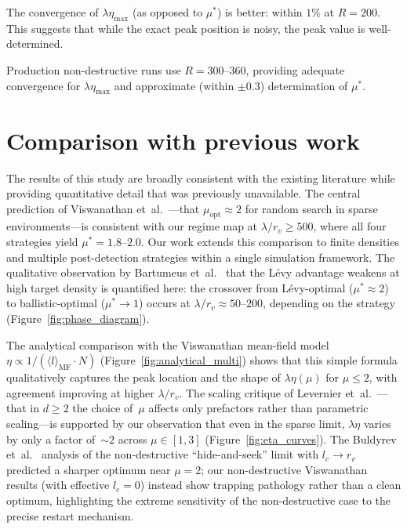 The convergence of $\lambda\eta_{\max}$ (as opposed to
$\mu^*$) is better: within $1\%$ at $R = 200$.  This
suggests that while the exact peak position is noisy, the
peak value is well-determined.

Production non-destructive runs use $R = 300$--$360$,
providing adequate convergence for $\lambda\eta_{\max}$ and
approximate (within $\pm 0.3$) determination of $\mu^*$.

\section{Comparison with previous work}

The results of this study are broadly consistent with the existing literature while providing quantitative detail that was previously unavailable. The central prediction of Viswanathan et~al.~\cite{viswanathan1999optimizing}---that $\mu_{\mathrm{opt}} \approx 2$ for random search in sparse environments---is consistent with our regime map at $\lambda/r_v \geq 500$, where all four strategies yield $\mu^* = 1.8$--$2.0$. Our work extends this comparison to finite densities and multiple post-detection strategies within a single simulation framework. The qualitative observation by Bartumeus et~al.~\cite{bartumeus2005animal} that the L\'evy advantage weakens at high target density is quantified here: the crossover from L\'evy-optimal ($\mu^* \approx 2$) to ballistic-optimal ($\mu^* \to 1$) occurs at $\lambda/r_v \approx 50$--$200$, depending on the strategy (Figure~\ref{fig:phase_diagram}).

The analytical comparison with the Viswanathan mean-field model $\eta \propto 1/(\langle l \rangle_{\mathrm{MF}} \cdot N)$ (Figure~\ref{fig:analytical_multi}) shows that this simple formula qualitatively captures the peak location and the shape of $\lambda\eta(\mu)$ for $\mu \leq 2$, with agreement improving at higher $\lambda/r_v$. The scaling critique of Levernier et~al.~\cite{levernier2020inverse}---that in $d \geq 2$ the choice of~$\mu$ affects only prefactors rather than parametric scaling---is supported by our observation that even in the sparse limit, $\lambda\eta$ varies by only a factor of~${\sim}2$ across $\mu \in [1,3]$ (Figure~\ref{fig:eta_curves}). The Buldyrev et~al.~\cite{buldyrev2021comment} analysis of the non-destructive ``hide-and-seek'' limit with $l_c \to r_v$ predicted a sharper optimum near $\mu = 2$; our non-destructive Viswanathan results (with effective $l_c = 0$) instead show trapping pathology rather than a clean optimum, highlighting the extreme sensitivity of the non-destructive case to the precise restart mechanism.

